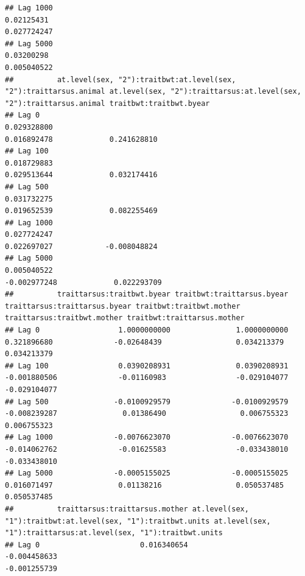 \documentclass[
  12pt,
]{book}
\begin{document}
\begin{verbatim}
## Lag 1000                                                     0.02125431                                                       0.027724247
## Lag 5000                                                     0.03200298                                                       0.005040522
##          at.level(sex, "2"):traitbwt:at.level(sex, "2"):traittarsus.animal at.level(sex, "2"):traittarsus:at.level(sex, "2"):traittarsus.animal traitbwt:traitbwt.byear
## Lag 0                                                          0.029328800                                                          0.016892478             0.241628810
## Lag 100                                                        0.018729883                                                          0.029513644             0.032174416
## Lag 500                                                        0.031732275                                                          0.019652539             0.082255469
## Lag 1000                                                       0.027724247                                                          0.022697027            -0.008048824
## Lag 5000                                                       0.005040522                                                         -0.002977248             0.022293709
##          traittarsus:traitbwt.byear traitbwt:traittarsus.byear traittarsus:traittarsus.byear traitbwt:traitbwt.mother traittarsus:traitbwt.mother traitbwt:traittarsus.mother
## Lag 0                  1.0000000000               1.0000000000                   0.321896680              -0.02648439                 0.034213379                 0.034213379
## Lag 100                0.0390208931               0.0390208931                  -0.001880506              -0.01160983                -0.029104077                -0.029104077
## Lag 500               -0.0100929579              -0.0100929579                  -0.008239287               0.01386490                 0.006755323                 0.006755323
## Lag 1000              -0.0076623070              -0.0076623070                  -0.014062762              -0.01625583                -0.033438010                -0.033438010
## Lag 5000              -0.0005155025              -0.0005155025                   0.016071497               0.01138216                 0.050537485                 0.050537485
##          traittarsus:traittarsus.mother at.level(sex, "1"):traitbwt:at.level(sex, "1"):traitbwt.units at.level(sex, "1"):traittarsus:at.level(sex, "1"):traitbwt.units
## Lag 0                       0.016340654                                                  -0.004458633                                                     -0.001255739

\end{verbatim}
\end{document}
